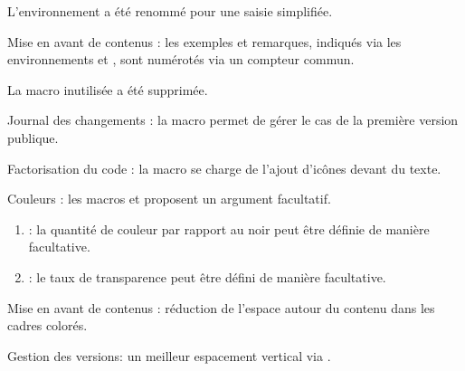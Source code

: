 \begin{tdocbreak}
    \item L'environnement  a été renommé  pour une saisie simplifiée.

    \item Mise en avant de contenus : les exemples et remarques, indiqués via les environnements  et , sont numérotés via un compteur commun.

    \item La macro inutilisée  a été supprimée.
\end{tdocbreak}


\begin{tdocnew}
    \item Journal des changements : la macro  permet de gérer le cas de la première version publique.

    \item Factorisation du code : la macro  se charge de l'ajout d'icônes devant du texte.
\end{tdocnew}


\begin{tdocupdate}
    \item Couleurs : les macros  et  proposent un argument facultatif.
    \begin{enumerate}
        \item {} : la quantité de couleur par rapport au noir peut être définie de manière facultative.

        \item {} : le taux de transparence peut être défini de manière facultative.
    \end{enumerate}

    \item Mise en avant de contenus : réduction de l'espace autour du contenu dans les cadres colorés.

    \item Gestion des versions: un meilleur espacement vertical via .
\end{tdocupdate}

